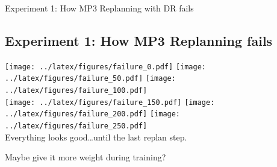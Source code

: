 \documentclass[16:9,en,navbarinfooter]{sdqbeamer}
\begin{document}
\begin{frame}{Experiment 1: How MP3 Replanning with DR fails}
	\subsection{Experiment 1: How MP3 Replanning fails}
	\begin{center}
		\texttt{[image: ../latex/figures/failure\_0.pdf]}
		\texttt{[image: ../latex/figures/failure\_50.pdf]}
		\vspace{-.5cm}
		\texttt{[image: ../latex/figures/failure\_100.pdf]} \\
		\texttt{[image: ../latex/figures/failure\_150.pdf]}
		\texttt{[image: ../latex/figures/failure\_200.pdf]}
		\texttt{[image: ../latex/figures/failure\_250.pdf]} \\
		Everything looks good\dots until the last replan step.

		Maybe give it more weight during training?
	\end{center}
\end{frame}
\end{document}
